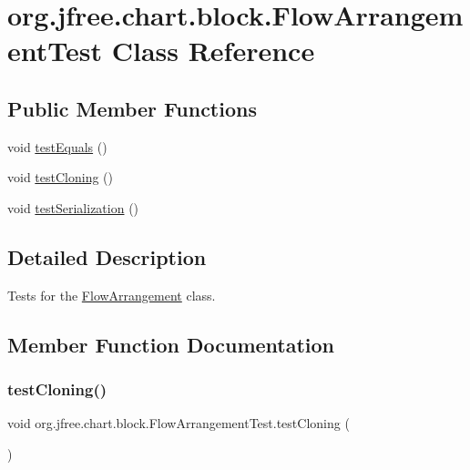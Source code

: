\hypertarget{classorg_1_1jfree_1_1chart_1_1block_1_1_flow_arrangement_test}{}\section{org.\+jfree.\+chart.\+block.\+Flow\+Arrangement\+Test Class Reference}
\label{classorg_1_1jfree_1_1chart_1_1block_1_1_flow_arrangement_test}
\subsection*{Public Member Functions}
\begin{DoxyCompactItemize}
\item 
void \mbox{\hyperlink{classorg_1_1jfree_1_1chart_1_1block_1_1_flow_arrangement_test_a8524cbcfe056c1807946f2d5823f6d3f}{test\+Equals}} ()
\item 
void \mbox{\hyperlink{classorg_1_1jfree_1_1chart_1_1block_1_1_flow_arrangement_test_a662cd25924933a986c8efe94519291aa}{test\+Cloning}} ()
\item 
void \mbox{\hyperlink{classorg_1_1jfree_1_1chart_1_1block_1_1_flow_arrangement_test_a63dc3eab2d51b8a8f9148aef61e384ee}{test\+Serialization}} ()
\end{DoxyCompactItemize}


\subsection{Detailed Description}
Tests for the \mbox{\hyperlink{classorg_1_1jfree_1_1chart_1_1block_1_1_flow_arrangement}{Flow\+Arrangement}} class. 

\subsection{Member Function Documentation}
\mbox{\label{classorg_1_1jfree_1_1chart_1_1block_1_1_flow_arrangement_test_a662cd25924933a986c8efe94519291aa}} 
\subsubsection{\texorpdfstring{test\+Cloning()}{testCloning()}}
{\footnotesize\ttfamily void org.\+jfree.\+chart.\+block.\+Flow\+Arrangement\+Test.\+test\+Cloning (\begin{DoxyParamCaption}{ }\end{DoxyParamCaption})}

